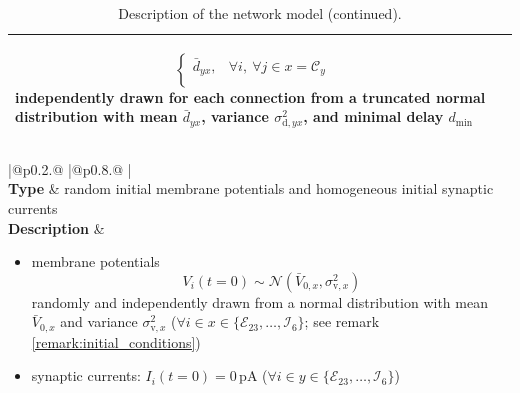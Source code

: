 \documentclass[10pt,a4paper,twoside,american]{article}
\theoremstyle{definitionstyle}
\begin{document}
\begin{table}[H]
\begin{tabular}{
  |@{\hspace*{\marg}}p{}@{\hspace*{\marg}}
  |@{\hspace*{\marg}}p{}@{\hspace*{\marg}}
  |}
\begin{itemize}
\begin{equation}
\begin{cases}
        \bar{d}_{yx}, & \forall i,\ \forall j \in x=\mathcal{C}_y \\
      \end{cases}
  \end{equation}
  independently drawn for each connection from a truncated normal distribution with mean $\bar{d}_{yx}$, variance $\sigma_{\text{d},yx}^2$, and minimal delay $d_\text{min}$
  \end{itemize}\\
  \hline
\end{tabular}
\begin{tabular}{
  |@{\hspace*{\marg}}p{}@{\hspace*{\marg}}
  |@{\hspace*{\marg}}p{}@{\hspace*{\marg}}
  |}
  \hline
  \\
\hline
\textbf{Type} & random initial membrane potentials and homogeneous initial synaptic currents\\
\hline
  \textbf{Description} &
  \begin{itemize}
  \item membrane potentials
    \begin{equation}
      V_i(t=0)\sim\mathcal{N}(\bar{V}_{0,x},\sigma_{\text{v},x}^2)
    \end{equation}
  randomly and independently drawn from a normal distribution with mean $\bar{V}_{0,x}$ and variance $\sigma^2_{\text{v},x}$ ($\forall i \in x\in\{\mathcal{E}_{23},\ldots,\mathcal{I}_{6}\}$; see remark \ref{remark:initial_conditions})
  \item synaptic currents: $I_{i}(t=0)=0\,\text{pA}$ ($\forall i \in y\in\{\mathcal{E}_{23},\ldots,\mathcal{I}_{6}\}$)
  \end{itemize}\\
  \hline
\end{tabular}
\caption{Description of the network model (continued).}
\end{table}
\clearpage
\end{document}
